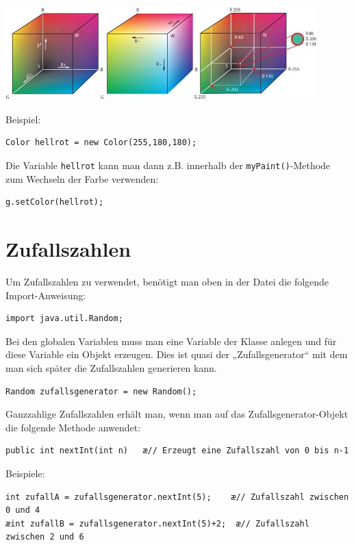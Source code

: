\begin{center}
\includegraphics[width=0.9\textwidth]{./inf/SEKII/09_Java_Farben_und_Zufall/RGB_farbwuerfel.jpg}
\end{center}

Beispiel:

\begin{lstlisting}
Color hellrot = new Color(255,180,180);
\end{lstlisting}

Die Variable \lstinline|hellrot| kann man dann z.B. innerhalb der
\lstinline|myPaint()|-Methode zum Wechseln der Farbe verwenden:

\begin{lstlisting}
g.setColor(hellrot);
\end{lstlisting}


\section{Zufallszahlen}

\begin{compactenum}[a)]
\item Um Zufallszahlen zu verwendet, benötigt man oben in der Datei die folgende
 Import-Anweisung:

\begin{lstlisting}
import java.util.Random;
\end{lstlisting}

\item Bei den globalen Variablen muss man eine Variable der Klasse
 anlegen und für diese Variable ein Objekt erzeugen. Dies ist
quasi der „Zufallsgenerator“ mit dem man sich später die Zufallszahlen
generieren kann.

\begin{lstlisting}
Random zufallsgenerator = new Random();
\end{lstlisting}

\item Ganzzahlige Zufallszahlen erhält man, wenn man auf das
Zufallsgenerator-Objekt die folgende Methode anwendet:

\begin{lstlisting}
public int nextInt(int n)   æ// Erzeugt eine Zufallszahl von 0 bis n-1
\end{lstlisting}

Beispiele:

\begin{lstlisting}
int zufallA = zufallsgenerator.nextInt(5);    æ// Zufallszahl zwischen 0 und 4
æint zufallB = zufallsgenerator.nextInt(5)+2;  æ// Zufallszahl zwischen 2 und 6
\end{lstlisting}
\end{compactenum}

